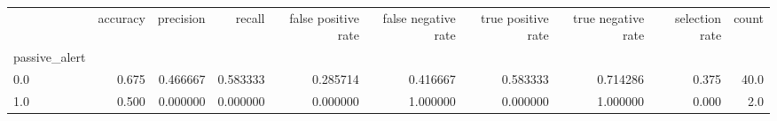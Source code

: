 \begin{tabular}{lrrrrrrrrr}
\toprule
{} &  accuracy &  precision &    recall &  false positive rate &  false negative rate &  true positive rate &  true negative rate &  selection rate &  count \\
passive\_alert &           &            &           &                      &                      &                     &                     &                 &        \\
\midrule
0.0           &     0.675 &   0.466667 &  0.583333 &             0.285714 &             0.416667 &            0.583333 &            0.714286 &           0.375 &   40.0 \\
1.0           &     0.500 &   0.000000 &  0.000000 &             0.000000 &             1.000000 &            0.000000 &            1.000000 &           0.000 &    2.0 \\
\bottomrule
\end{tabular}
